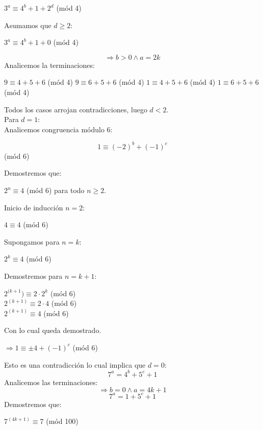 \documentclass{book}
\begin{document}
\begin{enumerate}
\begin{center}
					$3^a\equiv 4^b+1+2^d$  (mód 4)\\
				\end{center}
Asumamos que $d\geq 2$:
				\begin{center}
					$3^a\equiv 4^b+1+0$ (mód 4)
				\end{center}
$$\Rightarrow b>0 \wedge a=2k$$
Analicemos la terminaciones:
\begin{center}
$9\equiv 4+5+6$ (mód 4)
$9\equiv 6+5+6$ (mód 4)
$1\equiv 4+5+6$ (mód 4)
$1\equiv 6+5+6$ (mód 4)
\end{center}
Todos los casos arrojan contradicciones, luego $d<2$.\\
 Para $d=1$:\\
Analicemos congruencia módulo 6:
				\begin{center}
					$$1\equiv{(-2)}^b+{(-1)}^c$$  (mód 6)\\
				\end{center}
Demostremos que:
 				\begin{center}
 					$2^n\equiv 4$ (mód 6) para todo $n\geq2$.\\
 				\end{center}
Inicio de inducción $n=2$: 
				\begin{center}
					$4\equiv 4$ (mód 6)\\
				\end{center}
Supongamos para $n=k$: 
				\begin{center}
					$2^k\equiv 4$ (mód 6)\\
				\end{center}
Demostremos para $n=k+1$: 
				\begin{center}
					$2^{(k+1})\equiv 2\cdot 2^k$  (mód 6)\\
					$2^{(k+1)}\equiv 2\cdot 4$ (mód 6)\\
					$2^{(k+1)}\equiv 4$ (mód 6)\\
				\end{center}
Con lo cual queda demostrado.
				\begin{center}
					$\Rightarrow 1\equiv \pm 4+{(-1)}^c$  (mód 6)\\
				\end{center}
Esto es una contradicción lo cual implica que $d=0$:\\
$$7^a=4^b+5^c+1$$
Analicemos las terminaciones:
$$\Rightarrow b=0 \wedge a=4k+1$$ 
$$7^a=1+5^c+1$$
Demostremos que: 
				\begin{center}
					$7^{(4k+1)}\equiv 7$ (mód 100)\\
				\end{center}

\end{enumerate}
\end{document}
